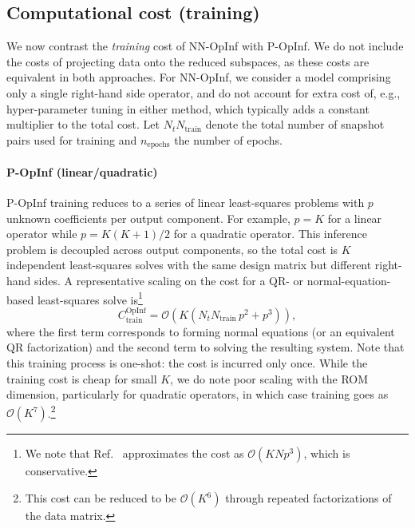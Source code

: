 \documentclass[3p,computermodern,11pt]{elsarticle}
\numberwithin{equation}{section}
\newcommand{\romDim}{K}
\begin{document}
\subsection{Computational cost (training)}
We now contrast the \emph{training} cost of NN-OpInf with P-OpInf. We do not include the costs of projecting data onto the reduced subspaces, as these costs are equivalent in both approaches. For NN-OpInf, we consider a model comprising only a single right-hand side operator, and do not account for extra cost of, e.g., hyper-parameter tuning in either method, which typically adds a constant multiplier to the total cost. Let $N_t N_{\text{train}}$ denote the total number of snapshot pairs used for training and $n_{\text{epochs}}$ the number of epochs.

\paragraph{P-OpInf (linear/quadratic)}
P-OpInf training reduces to a series of linear least-squares problems with $p$ unknown coefficients per output component.  For example, $p=\romDim$ for a linear operator while $p=\romDim(\romDim+1)/2$ for a quadratic operator. This inference problem is decoupled across output components, so the total cost is $K$ independent least-squares solves with the same design matrix but different right-hand sides. A representative scaling on the cost for a QR- or normal-equation-based least-squares solve is\footnote{We note that Ref.~\cite{PeWi16} approximates the cost as $\mathcal{O}(K N p^3)$, which is conservative.}
$$
C_{\text{train}}^{\text{OpInf}} = \mathcal{O}\!\left(K\left(N_t N_{\text{train}}\, p^2 + p^3\right)\right),
$$
where the first term corresponds to forming normal equations (or an equivalent QR factorization) and the second term to solving the resulting system. Note that this training process is one-shot: the cost is incurred only once. While the training cost is cheap for small $K$, we do note poor scaling with the ROM dimension, particularly for quadratic operators, in which case training goes as $\mathcal{O}(K^7)$.\footnote{This cost can be reduced to be $\mathcal{O}(K^6)$ through repeated factorizations of the data matrix.}
\end{document}
